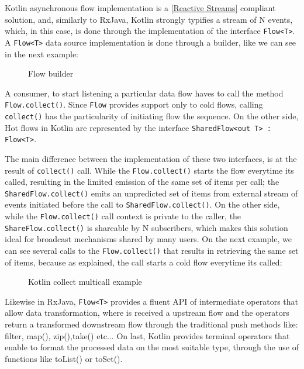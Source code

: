 Kotlin asynchronous flow implementation is a \ref{Reactive Streams} compliant solution, and, similarly to RxJava, Kotlin strongly typifies a stream of N events, which, in this case, is done through the implementation of the interface \texttt{Flow<T>}.\\
A \texttt{Flow<T>} data source implementation is done through a builder, like we can see in the next example:

\begin{figure}[H]
	\centering
	\caption{Flow builder}
	\label{fig:kotlinflow}
\end{figure}

A consumer, to start listening a particular data flow haves to call the method \texttt{Flow.collect()}. Since \texttt{Flow} provides support only to cold flows, calling \texttt{collect()} has the particularity of initiating flow the sequence.
On the other side, Hot flows in Kotlin are represented by the interface \texttt{SharedFlow<out T> : Flow<T>}. 

The main difference between the implementation of these two interfaces, is at the result of \texttt{collect()} call. 
While the \texttt{Flow.collect()} starts the flow everytime its called, resulting in the limited emission of the same set of items per call; the \texttt{SharedFlow.collect()} emits an unpredicted set of items from external stream of events initiated before the call to \texttt{SharedFlow.collect()}.
On the other side, while the \texttt{Flow.collect()} call context is private to the caller, the \texttt{ShareFlow.collect()} is shareable by N subscribers, which makes this solution ideal for broadcast mechanisms shared by many users.
On the next example, we can see several calls to the \texttt{Flow.collect()} that results in retrieving the same set of items, because as explained, the call starts a cold flow everytime its called:

\begin{figure}[H]
	\centering
	\caption{Kotlin collect multicall example}
	\label{fig:kotlinflowcold}
\end{figure}

Likewise in RxJava, \texttt{Flow<T>} provides a fluent API of intermediate operators that allow data transformation, where is received a upstream  flow and the operators return a transformed downstream flow through the traditional push methods like: filter, map(), zip(),take() etc... 
On last, Kotlin provides terminal operators that enable to format the processed data on the most suitable type, through the use of functions like toList() or toSet().

